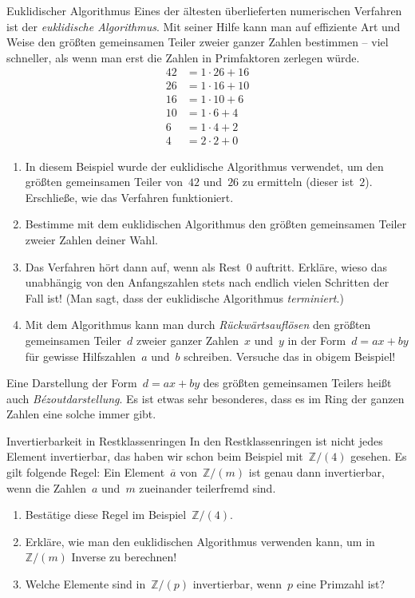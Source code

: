 \documentclass{zirkelblatt}
\newcommand{\ol}[1]{\ensuremath{\overline{#1}}}
\newcommand{\ZZ}{\mathbb{Z}}
\begin{document}
\newpage
\begin{aufgabe}{Euklidischer Algorithmus}
Eines der ältesten überlieferten numerischen Verfahren ist der
\emph{euklidische Algorithmus}. Mit seiner Hilfe kann man auf effiziente Art und Weise
den größten gemeinsamen Teiler zweier ganzer Zahlen bestimmen -- viel
schneller, als wenn man erst die Zahlen in Primfaktoren zerlegen würde.
\begin{align*}
    42 &= 1 \cdot 26 + 16 \\
    26 &= 1 \cdot 16 + 10 \\
    16 &= 1 \cdot 10 + 6 \\
    10 &= 1 \cdot 6 + 4 \\
    6 &= 1 \cdot 4 + 2 \\
    4 &= 2 \cdot 2 + 0
\end{align*}
\begin{enumerate}
\item In diesem Beispiel wurde der euklidische Algorithmus verwendet, um den
größten gemeinsamen Teiler von~$42$ und~$26$ zu ermitteln (dieser ist~$2$).
Erschließe, wie das Verfahren funktioniert.
\item Bestimme mit dem euklidischen Algorithmus den größten gemeinsamen Teiler
zweier Zahlen deiner Wahl.
\item Das Verfahren hört dann auf, wenn als Rest~$0$ auftritt. Erkläre, wieso
das unabhängig von den Anfangszahlen stets nach endlich vielen Schritten der
Fall ist! (Man sagt, dass der euklidische Algorithmus \emph{terminiert}.)
\item Mit dem Algorithmus kann man durch \emph{Rückwärtsauflösen} den größten
gemeinsamen Teiler~$d$ zweier ganzer Zahlen~$x$ und~$y$ in der Form~$d = ax +
by$ für gewisse Hilfszahlen~$a$ und~$b$ schreiben. Versuche das in obigem
Beispiel!
\end{enumerate}
Eine Darstellung der Form~$d = ax + by$ des größten gemeinsamen Teilers heißt
auch \emph{Bézoutdarstellung}. Es ist etwas sehr besonderes, dass es im Ring
der ganzen Zahlen eine solche immer gibt.
\end{aufgabe}

\begin{aufgabe}{Invertierbarkeit in Restklassenringen}
In den Restklassenringen ist nicht jedes Element invertierbar, das haben wir
schon beim Beispiel mit~$\ZZ/(4)$ gesehen. Es gilt folgende Regel: Ein
Element~$\ol{a}$ von~$\ZZ/(m)$ ist genau dann invertierbar, wenn die Zahlen~$a$
und~$m$ zueinander teilerfremd sind.
\begin{enumerate}
\item Bestätige diese Regel im Beispiel~$\ZZ/(4)$.
\item Erkläre, wie man den euklidischen Algorithmus verwenden kann, um
in~$\ZZ/(m)$ Inverse zu berechnen!
\item Welche Elemente sind in~$\ZZ/(p)$ invertierbar, wenn~$p$ eine Primzahl
ist?
\end{enumerate}
\end{aufgabe}
\end{document}
